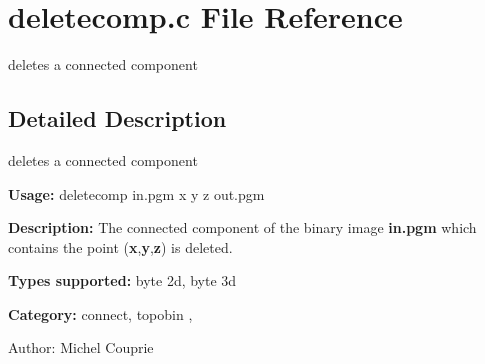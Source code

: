 \section{deletecomp.c File Reference}
\label{deletecomp_8c}
deletes a connected component  




\label{_details}
\subsection{Detailed Description}
deletes a connected component 

{\bf Usage:} deletecomp in.pgm x y z out.pgm

{\bf Description:} The connected component of the binary image {\bf in.pgm} which contains the point ({\bf x},{\bf y},{\bf z}) is deleted.

{\bf Types supported:} byte 2d, byte 3d

{\bf Category:} connect, topobin ,

\begin{Desc}
\item[Author:]Michel Couprie \end{Desc}
